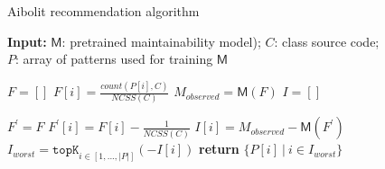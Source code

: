 \begin{algorithm}[t]
\caption{Aibolit recommendation algorithm} 
\hspace{\algorithmicindent} 
\textbf{Input:}  $\mathsf{M}$: pretrained
maintainability model); $C$: class source code; \\ 
\hspace{\algorithmicindent} $P$: array of patterns used for training $\mathsf{M}$\\ 

\begin{algorithmic}[1]
\State $F = [ ]$ \label{line:init_F} 
\State $F[i] =\frac{\textit{count}(P[i], C)}{\textit{NCSS}(C)}$%
\EndFor \State $M_{\textit{observed}} = \mathsf{M}(F)$ \label{line:compute_m_source}
\State $I = [ ]$ \label{line:init_I}

\State $F^{\prime} = F$
\State $F^{\prime}[i] = F[i] - \frac{1}{\textit{NCSS}(C)}$ \label{line:f_prime} %
\State $I[i] = M_{\textit{observed}} - \mathsf{M}(F^{\prime})$ \label{line:impact} %
\EndFor
\State $I_{\textit{worst}} = \texttt{topK}_{i \in [1,...,|P|]} (-I[i])$ \label{line:topK}
\State \textbf{return} $\{P[i]~|~i \in I_{\textit{worst}}\}$ \label{line:return}

\end{algorithmic} 
\centering
\label{fig:recsys_alg} 
\end{algorithm}

 



